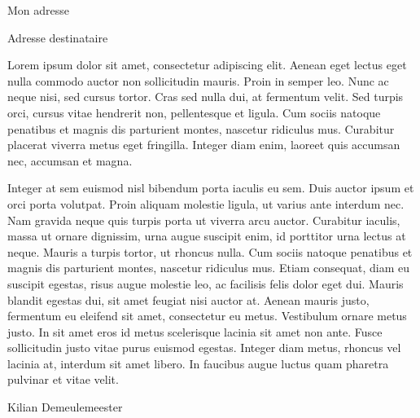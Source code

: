 \documentclass[a4paper,10pt]{report}
\begin{document}
 
 
 \begin{flushright} Mon adresse \end{flushright}
 
 Adresse destinataire
 
 Lorem ipsum dolor sit amet, consectetur adipiscing elit. Aenean eget lectus eget nulla commodo auctor non sollicitudin mauris. Proin in semper leo. Nunc ac neque nisi, sed cursus tortor. Cras sed nulla dui, at fermentum velit. Sed turpis orci, cursus vitae hendrerit non, pellentesque et ligula. Cum sociis natoque penatibus et magnis dis parturient montes, nascetur ridiculus mus. Curabitur placerat viverra metus eget fringilla. Integer diam enim, laoreet quis accumsan nec, accumsan et magna.

Integer at sem euismod nisl bibendum porta iaculis eu sem. Duis auctor ipsum et orci porta volutpat. Proin aliquam molestie ligula, ut varius ante interdum nec. Nam gravida neque quis turpis porta ut viverra arcu auctor. Curabitur iaculis, massa ut ornare dignissim, urna augue suscipit enim, id porttitor urna lectus at neque. Mauris a turpis tortor, ut rhoncus nulla. Cum sociis natoque penatibus et magnis dis parturient montes, nascetur ridiculus mus. Etiam consequat, diam eu suscipit egestas, risus augue molestie leo, ac facilisis felis dolor eget dui. Mauris blandit egestas dui, sit amet feugiat nisi auctor at. Aenean mauris justo, fermentum eu eleifend sit amet, consectetur eu metus. Vestibulum ornare metus justo. In sit amet eros id metus scelerisque lacinia sit amet non ante. Fusce sollicitudin justo vitae purus euismod egestas. Integer diam metus, rhoncus vel lacinia at, interdum sit amet libero. In faucibus augue luctus quam pharetra pulvinar et vitae velit.
 
 \begin{center} Kilian Demeulemeester \end{center}
 
\end{document}
